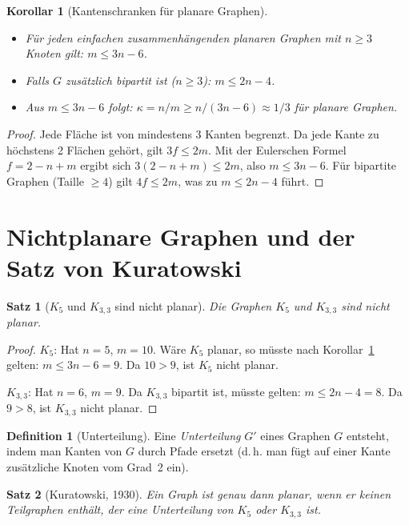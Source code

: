 ﻿\documentclass[a4paper,12pt,openany,oneside]{book}
\theoremstyle{definition}
\newtheorem{definition}{Definition}[chapter]
\theoremstyle{plain}
\newtheorem{satz}{Satz}[chapter]
\newtheorem{korollar}{Korollar}[chapter]
\theoremstyle{remark}
\begin{document}
\begin{korollar}[Kantenschranken f\"ur planare Graphen]
  \label{kor:kantenschranken}
  \begin{itemize}
    \item F\"ur jeden einfachen zusammenh\"angenden planaren Graphen mit
          $n \geq 3$ Knoten gilt: $m \leq 3n - 6$.
    \item Falls $G$ zus\"atzlich bipartit ist ($n \geq 3$):
          $m \leq 2n - 4$.
    \item Aus $m \leq 3n-6$ folgt: $\kappa = n/m \geq n/(3n-6) \approx 1/3$
          f\"ur planare Graphen.
  \end{itemize}
\end{korollar}

\begin{proof}
  Jede Fl\"ache ist von mindestens 3 Kanten begrenzt. Da jede Kante zu
  h\"ochstens 2 Fl\"achen geh\"ort, gilt $3f \leq 2m$. Mit der Eulerschen
  Formel $f = 2 - n + m$ ergibt sich $3(2-n+m) \leq 2m$, also $m \leq 3n-6$.
  F\"ur bipartite Graphen (Taille $\geq 4$) gilt $4f \leq 2m$, was zu
  $m \leq 2n-4$ f\"uhrt.
\end{proof}

\section{Nichtplanare Graphen und der Satz von Kuratowski}

\begin{satz}[$K_5$ und $K_{3,3}$ sind nicht planar]
  Die Graphen $K_5$ und $K_{3,3}$ sind nicht planar.
\end{satz}

\begin{proof}
  $K_5$: Hat $n = 5$, $m = 10$. W\"are $K_5$ planar, so m\"usste nach
  Korollar~\ref{kor:kantenschranken} gelten: $m \leq 3n - 6 = 9$.
  Da $10 > 9$, ist $K_5$ nicht planar.

  $K_{3,3}$: Hat $n = 6$, $m = 9$. Da $K_{3,3}$ bipartit ist, m\"usste
  gelten: $m \leq 2n - 4 = 8$. Da $9 > 8$, ist $K_{3,3}$ nicht planar.
\end{proof}

\begin{definition}[Unterteilung]
  Eine \emph{Unterteilung} $G'$ eines Graphen $G$ entsteht, indem man
  Kanten von $G$ durch Pfade ersetzt (d.\,h. man f\"ugt auf einer Kante
  zus\"atzliche Knoten vom Grad~2 ein).
\end{definition}

\begin{satz}[Kuratowski, 1930]
  Ein Graph ist genau dann planar, wenn er keinen Teilgraphen enth\"alt,
  der eine Unterteilung von $K_5$ oder $K_{3,3}$ ist.
\end{satz}
\end{document}
